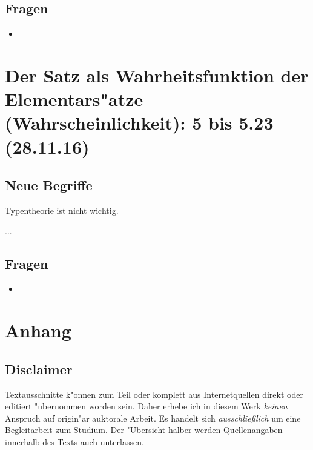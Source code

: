 \documentclass[emulatestandardclasses]{scrartcl}
\begin{document}
\subsection{Fragen}

\begin{itemize}
  \item 
\end{itemize}


\section{Der Satz als Wahrheitsfunktion der Elementars"atze (Wahrscheinlichkeit): 5 bis 5.23\\(28.11.16)}

\vspace{10pt}
\subsection{Neue Begriffe}

Typentheorie ist nicht wichtig.

\begin{description}[leftmargin=!,labelwidth=\widthof{\bfseries Sachverhalt}]
  \item[Bild] ...
  \item[Tatsache] 
\end{description}

\subsection{Fragen}

\begin{itemize}
  \item 
\end{itemize}


\newpage
\section{Anhang}

\subsection{Disclaimer}

Textausschnitte k"onnen zum Teil oder komplett aus Internetquellen direkt oder editiert "ubernommen worden sein. Daher erhebe ich in diesem Werk \emph{keinen} Anspruch auf origin"ar auktorale Arbeit. Es handelt sich \emph{ausschlie\ss lich} um eine Begleitarbeit zum Studium. Der "Ubersicht halber werden Quellenangaben innerhalb des Texts auch unterlassen. 
\end{document}
